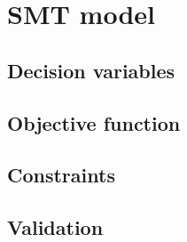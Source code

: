 \section{SMT model}


\subsection{Decision variables}


\subsection{Objective function}


\subsection{Constraints}


\subsection{Validation}
